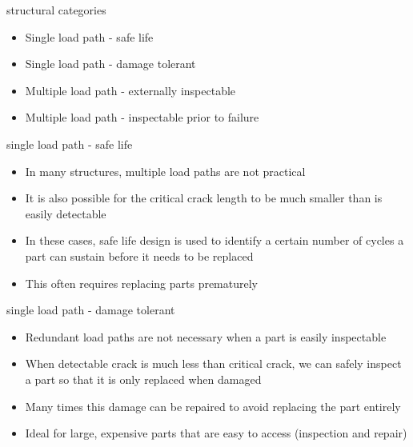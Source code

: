 \documentclass[
  letterpaper,
  ignorenonframetext,
  aspectratio=43,
  handout,
  12pt]{beamer}
\providecommand{\tightlist}{%
  \setlength{\itemsep}{0pt}\setlength{\parskip}{0pt}}
\providecommand{\tightlist}{%
\setlength{\itemsep}{0pt}\setlength{\parskip}{0pt}}
\begin{document}
\begin{frame}{structural categories}
\protect\hypertarget{structural-categories}{}
\begin{itemize}
\tightlist
\item
  Single load path - safe life
\item
  Single load path - damage tolerant
\item
  Multiple load path - externally inspectable
\item
  Multiple load path - inspectable prior to failure
\end{itemize}
\end{frame}

\begin{frame}{single load path - safe life}
\protect\hypertarget{single-load-path---safe-life}{}
\begin{itemize}
\tightlist
\item
  In many structures, multiple load paths are not practical
\item
  It is also possible for the critical crack length to be much smaller
  than is easily detectable
\item
  In these cases, safe life design is used to identify a certain number
  of cycles a part can sustain before it needs to be replaced
\item
  This often requires replacing parts prematurely
\end{itemize}
\end{frame}

\begin{frame}{single load path - damage tolerant}
\protect\hypertarget{single-load-path---damage-tolerant}{}
\begin{itemize}
\tightlist
\item
  Redundant load paths are not necessary when a part is easily
  inspectable
\item
  When detectable crack is much less than critical crack, we can safely
  inspect a part so that it is only replaced when damaged
\item
  Many times this damage can be repaired to avoid replacing the part
  entirely
\item
  Ideal for large, expensive parts that are easy to access (inspection
  and repair)
\end{itemize}
\end{frame}
\end{document}
